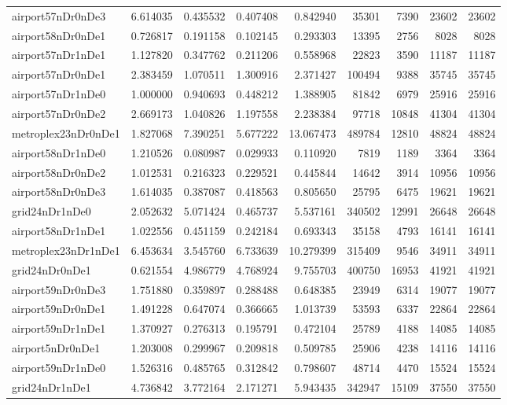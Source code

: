 \begin{longtable}{|l|r|r|r|r|r|r|r|r|}
airport57nDr0nDe3 & 6.614035 & 0.435532 & 0.407408 & 0.842940 & 35301 & 7390 & 23602 & 23602 \\
airport58nDr0nDe1 & 0.726817 & 0.191158 & 0.102145 & 0.293303 & 13395 & 2756 & 8028 & 8028 \\
airport57nDr1nDe1 & 1.127820 & 0.347762 & 0.211206 & 0.558968 & 22823 & 3590 & 11187 & 11187 \\
airport57nDr0nDe1 & 2.383459 & 1.070511 & 1.300916 & 2.371427 & 100494 & 9388 & 35745 & 35745 \\
airport57nDr1nDe0 & 1.000000 & 0.940693 & 0.448212 & 1.388905 & 81842 & 6979 & 25916 & 25916 \\
airport57nDr0nDe2 & 2.669173 & 1.040826 & 1.197558 & 2.238384 & 97718 & 10848 & 41304 & 41304 \\
metroplex23nDr0nDe1 & 1.827068 & 7.390251 & 5.677222 & 13.067473 & 489784 & 12810 & 48824 & 48824 \\
airport58nDr1nDe0 & 1.210526 & 0.080987 & 0.029933 & 0.110920 & 7819 & 1189 & 3364 & 3364 \\
airport58nDr0nDe2 & 1.012531 & 0.216323 & 0.229521 & 0.445844 & 14642 & 3914 & 10956 & 10956 \\
airport58nDr0nDe3 & 1.614035 & 0.387087 & 0.418563 & 0.805650 & 25795 & 6475 & 19621 & 19621 \\
grid24nDr1nDe0 & 2.052632 & 5.071424 & 0.465737 & 5.537161 & 340502 & 12991 & 26648 & 26648 \\
airport58nDr1nDe1 & 1.022556 & 0.451159 & 0.242184 & 0.693343 & 35158 & 4793 & 16141 & 16141 \\
metroplex23nDr1nDe1 & 6.453634 & 3.545760 & 6.733639 & 10.279399 & 315409 & 9546 & 34911 & 34911 \\
grid24nDr0nDe1 & 0.621554 & 4.986779 & 4.768924 & 9.755703 & 400750 & 16953 & 41921 & 41921 \\
airport59nDr0nDe3 & 1.751880 & 0.359897 & 0.288488 & 0.648385 & 23949 & 6314 & 19077 & 19077 \\
airport59nDr0nDe1 & 1.491228 & 0.647074 & 0.366665 & 1.013739 & 53593 & 6337 & 22864 & 22864 \\
airport59nDr1nDe1 & 1.370927 & 0.276313 & 0.195791 & 0.472104 & 25789 & 4188 & 14085 & 14085 \\
airport5nDr0nDe1 & 1.203008 & 0.299967 & 0.209818 & 0.509785 & 25906 & 4238 & 14116 & 14116 \\
airport59nDr1nDe0 & 1.526316 & 0.485765 & 0.312842 & 0.798607 & 48714 & 4470 & 15524 & 15524 \\
grid24nDr1nDe1 & 4.736842 & 3.772164 & 2.171271 & 5.943435 & 342947 & 15109 & 37550 & 37550 \\

\end{longtable}
